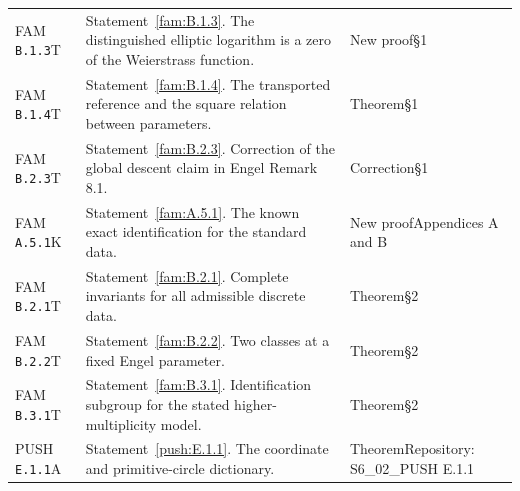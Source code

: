 \begin{longtable}{@{}L{.18\linewidth}L{.48\linewidth}L{.29\linewidth}@{}}
FAM \nolinkurl{B.1.3}\newline T & Statement~\ref{fam:B.1.3}. The distinguished elliptic logarithm is a zero of the Weierstrass function.\newline {} & New proof\newline §1\\
FAM \nolinkurl{B.1.4}\newline T & Statement~\ref{fam:B.1.4}. The transported reference and the square relation between parameters.\newline {} & Theorem\newline §1\\
FAM \nolinkurl{B.2.3}\newline T & Statement~\ref{fam:B.2.3}. Correction of the global descent claim in Engel Remark 8.1.\newline {} & Correction\newline §1\\
FAM \nolinkurl{A.5.1}\newline K & Statement~\ref{fam:A.5.1}. The known exact identification for the standard data.\newline {} & New proof\newline Appendices A and B\\
FAM \nolinkurl{B.2.1}\newline T & Statement~\ref{fam:B.2.1}. Complete invariants for all admissible discrete data.\newline {} & Theorem\newline §2\\
FAM \nolinkurl{B.2.2}\newline T & Statement~\ref{fam:B.2.2}. Two classes at a fixed Engel parameter.\newline {} & Theorem\newline §2\\
FAM \nolinkurl{B.3.1}\newline T & Statement~\ref{fam:B.3.1}. Identification subgroup for the stated higher-multiplicity model.\newline {} & Theorem\newline §2\\
PUSH \nolinkurl{E.1.1}\newline A & Statement~\ref{push:E.1.1}. The coordinate and primitive-circle dictionary.\newline {} & Theorem\newline Repository:\allowbreak{} S6\_\allowbreak{}02\_\allowbreak{}PUSH E.1.1\\

\end{longtable}
